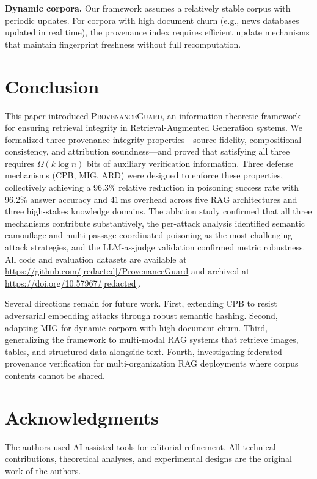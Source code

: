 \documentclass[journal,10pt]{IEEEtran}
\begin{document}
\textbf{Dynamic corpora.} Our framework assumes a relatively stable corpus with periodic updates. For corpora with high document churn (e.g., news databases updated in real time), the provenance index requires efficient update mechanisms that maintain fingerprint freshness without full recomputation.

\section{Conclusion}\label{sec:conclusion}

This paper introduced \textsc{ProvenanceGuard}, an information-theoretic framework for ensuring retrieval integrity in Retrieval-Augmented Generation systems. We formalized three provenance integrity properties---source fidelity, compositional consistency, and attribution soundness---and proved that satisfying all three requires $\Omega(k \log n)$ bits of auxiliary verification information. Three defense mechanisms (CPB, MIG, ARD) were designed to enforce these properties, collectively achieving a 96.3\% relative reduction in poisoning success rate with 96.2\% answer accuracy and 41\,ms overhead across five RAG architectures and three high-stakes knowledge domains. The ablation study confirmed that all three mechanisms contribute substantively, the per-attack analysis identified semantic camouflage and multi-passage coordinated poisoning as the most challenging attack strategies, and the LLM-as-judge validation confirmed metric robustness. All code and evaluation datasets are available at \url{https://github.com/[redacted]/ProvenanceGuard} and archived at \url{https://doi.org/10.57967/[redacted]}.

Several directions remain for future work. First, extending CPB to resist adversarial embedding attacks through robust semantic hashing. Second, adapting MIG for dynamic corpora with high document churn. Third, generalizing the framework to multi-modal RAG systems that retrieve images, tables, and structured data alongside text. Fourth, investigating federated provenance verification for multi-organization RAG deployments where corpus contents cannot be shared.

\section*{Acknowledgments}
The authors used AI-assisted tools for editorial refinement. All technical contributions, theoretical analyses, and experimental designs are the original work of the authors.
\end{document}
